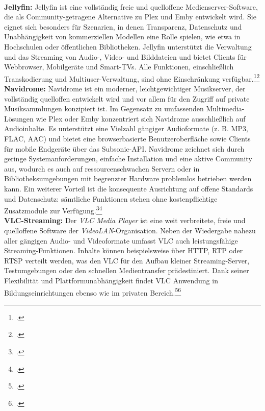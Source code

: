 \documentclass[12pt,a4paper]{report}
\begin{document}
  \\
  \newline
  \textbf{Jellyfin:}
  Jellyfin ist eine vollständig freie und quelloffene Medienserver-Software, die als Community-getragene Alternative zu Plex und Emby entwickelt wird. 
  Sie eignet sich besonders für Szenarien, in denen Transparenz, Datenschutz 
  und Unabhängigkeit von kommerziellen Modellen eine Rolle spielen, wie etwa in Hochschulen oder öffentlichen Bibliotheken. 
  Jellyfin unterstützt die Verwaltung und das Streaming von Audio-, Video- und Bilddateien und bietet Clients für Webbrowser, Mobilgeräte und Smart-TVs. 
  Alle Funktionen, einschließlich Transkodierung und Multiuser-Verwaltung, 
  sind ohne Einschränkung verfügbar.\footcite[Vgl.][]{wikipedia_jellyfin}\footcite[Vgl.][]{jellyfin_docs}
  \\
  \newline
  \textbf{Navidrome:}
  Navidrome ist ein moderner, leichtgewichtiger Musikserver, der vollständig quelloffen entwickelt wird und vor allem für den Zugriff auf private Musiksammlungen konzipiert ist.
  Im Gegensatz zu umfassenden Multimedia-Lösungen wie Plex oder Emby konzentriert sich Navidrome ausschließlich auf Audioinhalte.
  Es unterstützt eine Vielzahl gängiger Audioformate (z. B. \ac{MP3}, \ac{FLAC}, \ac{AAC}) und bietet eine browserbasierte Benutzeroberfläche 
  sowie Clients für mobile Endgeräte über das Subsonic-\ac{API}.
  Navidrome zeichnet sich durch geringe Systemanforderungen, einfache Installation und eine aktive Community aus, 
  wodurch es auch auf ressourcenschwachen Servern oder in Bibliotheksumgebungen mit begrenzter Hardware problemlos betrieben werden kann.
  Ein weiterer Vorteil ist die konsequente Ausrichtung auf offene Standards 
  und Datenschutz: sämtliche Funktionen stehen ohne kostenpflichtige Zusatzmodule zur Verfügung.\footcite[Vgl.][]{navidrome2024}\footcite[Vgl.][]{wikipedia_navidrome}
  \\
  \newline  
  \textbf{VLC-Streaming:}
  Der \emph{VLC Media Player} ist eine weit verbreitete, freie und quelloffene Software der \emph{VideoLAN}-Organisation. 
  Neben der Wiedergabe nahezu aller gängigen Audio- und Videoformate umfasst VLC auch leistungsfähige Streaming-Funktionen. 
  Inhalte können beispielsweise über \ac{HTTP}, \ac{RTP} oder \ac{RTSP} verteilt werden, was den VLC für den Aufbau kleiner Streaming-Server, 
  Testumgebungen oder den schnellen Medientransfer prädestiniert. 
  Dank seiner Flexibilität und Plattformunabhängigkeit findet VLC Anwendung in Bildungseinrichtungen ebenso wie im privaten Bereich.\footcite[Vgl.][]{wikipedia_vlc}\footcite[Vgl.][]{vlc_docs}  
\end{document}
